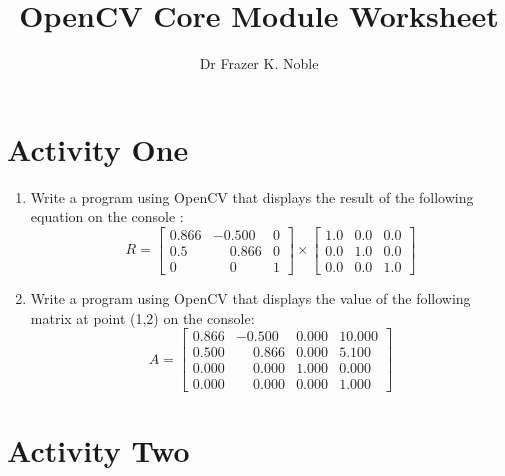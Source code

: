 \documentclass[12pt, A4]{article}
\title{OpenCV Core Module Worksheet}
\author{Dr Frazer K. Noble}
\date{}
\begin{document}
\maketitle

\section*{Activity One}

\begin{enumerate}[label=(\alph*)]

    \item Write a program using OpenCV that displays the result of the following equation on the console :
    \begin{equation*}
        R = 
        \begin{bmatrix}
            0.866 & -0.500 & 0\\
            0.5 & \phantom{-}0.866 & 0\\
            0 & \phantom{-}0 & 1
        \end{bmatrix}
        \times
        \begin{bmatrix}
            1.0 & 0.0 & 0.0\\
            0.0 & 1.0 & 0.0\\
            0.0 & 0.0 & 1.0
        \end{bmatrix}
    \end{equation*}

    \item Write a program using OpenCV that displays the value of the following matrix at point (1,2) on the console:
    \begin{equation*}
        A =
        \begin{bmatrix}
            0.866 & -0.500 & 0.000 & 10.000\\
            0.500 & \phantom{-}0.866 & 0.000 & 5.100\\
            0.000 & \phantom{-}0.000 & 1.000 & 0.000\\
            0.000 & \phantom{-}0.000 & 0.000 & 1.000
        \end{bmatrix}
    \end{equation*}

\end{enumerate}


\section*{Activity Two}
\end{document}
